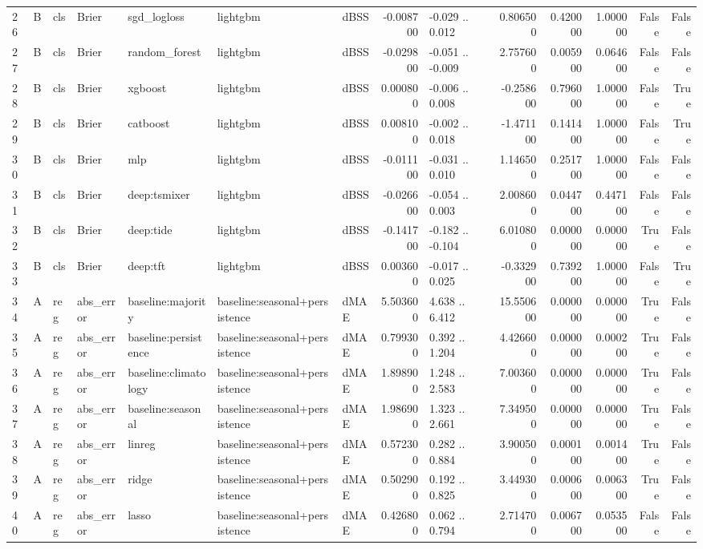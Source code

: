 \begin{table}
\begin{tabular}{lllllllrlrrrrr}
26 & B & cls & Brier & sgd\_logloss & lightgbm & dBSS & -0.008700 & -0.029 .. 0.012 & 0.806500 & 0.420000 & 1.000000 & False & False \\
27 & B & cls & Brier & random\_forest & lightgbm & dBSS & -0.029800 & -0.051 .. -0.009 & 2.757600 & 0.005900 & 0.064600 & False & False \\
28 & B & cls & Brier & xgboost & lightgbm & dBSS & 0.000800 & -0.006 .. 0.008 & -0.258600 & 0.796000 & 1.000000 & False & True \\
29 & B & cls & Brier & catboost & lightgbm & dBSS & 0.008100 & -0.002 .. 0.018 & -1.471100 & 0.141400 & 1.000000 & False & True \\
30 & B & cls & Brier & mlp & lightgbm & dBSS & -0.011100 & -0.031 .. 0.010 & 1.146500 & 0.251700 & 1.000000 & False & False \\
31 & B & cls & Brier & deep:tsmixer & lightgbm & dBSS & -0.026600 & -0.054 .. 0.003 & 2.008600 & 0.044700 & 0.447100 & False & False \\
32 & B & cls & Brier & deep:tide & lightgbm & dBSS & -0.141700 & -0.182 .. -0.104 & 6.010800 & 0.000000 & 0.000000 & True & False \\
33 & B & cls & Brier & deep:tft & lightgbm & dBSS & 0.003600 & -0.017 .. 0.025 & -0.332900 & 0.739200 & 1.000000 & False & True \\
34 & A & reg & abs\_error & baseline:majority & baseline:seasonal+persistence & dMAE & 5.503600 & 4.638 .. 6.412 & 15.550600 & 0.000000 & 0.000000 & True & False \\
35 & A & reg & abs\_error & baseline:persistence & baseline:seasonal+persistence & dMAE & 0.799300 & 0.392 .. 1.204 & 4.426600 & 0.000000 & 0.000200 & True & False \\
36 & A & reg & abs\_error & baseline:climatology & baseline:seasonal+persistence & dMAE & 1.898900 & 1.248 .. 2.583 & 7.003600 & 0.000000 & 0.000000 & True & False \\
37 & A & reg & abs\_error & baseline:seasonal & baseline:seasonal+persistence & dMAE & 1.986900 & 1.323 .. 2.661 & 7.349500 & 0.000000 & 0.000000 & True & False \\
38 & A & reg & abs\_error & linreg & baseline:seasonal+persistence & dMAE & 0.572300 & 0.282 .. 0.884 & 3.900500 & 0.000100 & 0.001400 & True & False \\
39 & A & reg & abs\_error & ridge & baseline:seasonal+persistence & dMAE & 0.502900 & 0.192 .. 0.825 & 3.449300 & 0.000600 & 0.006300 & True & False \\
40 & A & reg & abs\_error & lasso & baseline:seasonal+persistence & dMAE & 0.426800 & 0.062 .. 0.794 & 2.714700 & 0.006700 & 0.053500 & False & False \\

\end{tabular}
\end{table}
